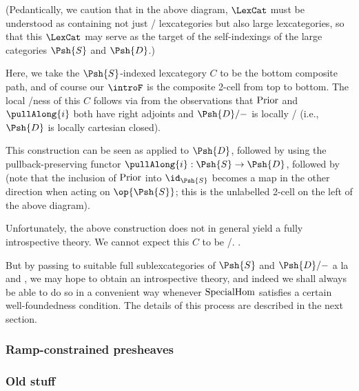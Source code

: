 \begin{construction}
(Pedantically, we caution that in the above diagram, $\LexCat$ must be understood as containing not just \setsmall/ lexcategories but also large lexcategories, so that this $\LexCat$ may serve as the target of the self-indexings of the large categories $\Psh{S}$ and $\Psh{D}$.)

Here, we take the $\Psh{S}$-indexed lexcategory $C$ to be the bottom composite path, and of course our $\introF$ is the composite 2-cell from top to bottom. The local \repsmall/ness of this $C$ follows via  from the observations that $\mathrm{Prior}$ and $\pullAlong{i}$ both have right adjoints and $\Psh{D}/-$ is locally \repsmall/ (i.e., $\Psh{D}$ is locally cartesian closed).

This construction can be seen as  applied to $\Psh{D}$, followed by  using the pullback-preserving functor $\pullAlong{i} : \Psh{S} \to \Psh{D}$, followed by  (note that the inclusion of $\mathrm{Prior}$ into $\id_{\Psh{S}}$ becomes a map in the other direction when acting on $\op{\Psh{S}}$; this is the unlabelled 2-cell on the left of the above diagram).
\end{construction}


Unfortunately, the above construction does not in general yield a fully introspective theory. We cannot expect this $C$ to be \repsmall/. .

But by passing to suitable full sublexcategories of $\Psh{S}$ and $\Psh{D}/-$ a la  and , we may hope to obtain an introspective theory, and indeed we shall always be able to do so in a convenient way whenever $\mathrm{SpecialHom}$ satisfies a certain well-foundedness condition. The details of this process are described in the next section.

\subsubsection{Ramp-constrained presheaves}
\TODO

\subsubsection{Old stuff}


